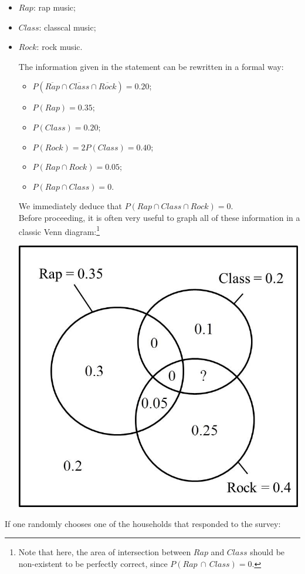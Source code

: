 \documentclass[12pt,thmsa]{article}
\begin{document}
\begin{itemize}
\item $Rap$: rap music;
\item $Class$: classcal music;
\item $Rock$: rock music.

The information given in the statement can be rewritten in a formal way:

\begin{itemize}
\item $P(\overline{Rap}\cap\overline{Class}\cap\overline{Rock})=0.20$;
\item $P(Rap)=0.35$;
\item $P(Class)=0.20$;
\item $P(Rock)=2P(Class)= 0.40$;
\item $P(Rap\cap Rock)=0.05$;
\item $P(Rap\cap Class)=0$.
\end{itemize}

We immediately deduce that $P(Rap\cap Class\cap Rock)=0$.\\


\medskip
\noindent Before proceeding, it is often very useful to graph all of these information in a classic Venn diagram:\footnote{Note that here, the area of intersection between $Rap$ and $Class$ should be non-existent to be perfectly correct, since $P(Rap\,\cap\, Class)=0$.}\\
\begin{center}
\includegraphics[scale=0.8]{Graph1.jpg}
\end{center}


\end{itemize}
\noindent If one randomly chooses one of the households that responded to the
  survey:
\end{document}
